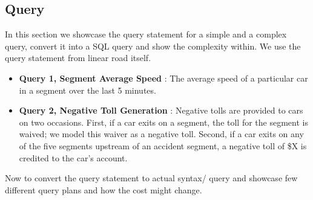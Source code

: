 \subsection{Query}
In this section we showcase the query statement for a simple and a complex query, convert it into a SQL query and show the complexity within. We use the query statement from linear road itself.
\begin{itemize}
    \item \textbf{Query 1, Segment Average Speed } : The average speed of a particular car in a segment over the last 5 minutes. 
    \item \textbf{Query 2, Negative Toll Generation} : Negative tolls are provided to cars on two occasions. First, if a car exits on a segment, the toll for the segment is waived; we model this waiver as a negative toll. Second, if a car exits on any of the five segments upstream of an accident segment, a negative toll of \$X is credited to the car's account. 
\end{itemize}
Now to convert the query statement to actual syntax/ query and showcase few different query plans and how the cost might change.



